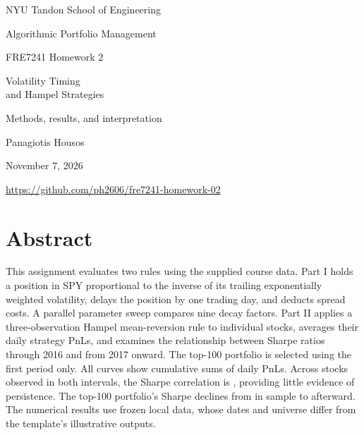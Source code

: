 \documentclass[11pt,letterpaper]{article}
\begin{document}
\hypersetup{pageanchor=false}
\begin{titlepage}
\vspace*{0.6in}
{\color{teal}\large NYU Tandon School of Engineering\par}
\vspace{0.25in}
{\color{navy}\LARGE Algorithmic Portfolio Management\par}
\vspace{0.15in}
{\large FRE7241 \quad Homework 2\par}
\vspace{0.65in}
{\color{navy}\Huge Volatility Timing\\[0.12in]and Hampel Strategies\par}
\vspace{0.3in}
{\Large Methods, results, and interpretation\par}
\vspace{0.65in}
{\Large Panagiotis Housos\par}
\vspace{0.12in}
{\large November 7, 2026\par}
\vspace{0.3in}
{\small\url{https://github.com/ph2606/fre7241-homework-02}\par}
\end{titlepage}
\hypersetup{pageanchor=true}

\section*{Abstract}
This assignment evaluates two rules using the supplied course data. Part I
holds a position in SPY proportional to the inverse of its trailing
exponentially weighted volatility, delays the position by one trading day,
and deducts spread costs. A parallel parameter sweep compares nine decay
factors. Part II applies a three-observation Hampel mean-reversion rule to
individual stocks, averages their daily strategy PnLs, and examines the
relationship between Sharpe ratios through 2016 and from 2017 onward. The
top-100 portfolio is selected using the first period only. All curves show
cumulative sums of daily PnLs. Across \HWMatchedStocks{} stocks observed
in both intervals, the Sharpe correlation is
\HWPersistenceCorrelation{}, providing little evidence of persistence.
The top-100 portfolio's Sharpe declines from \HWTopISSharpe{} in sample to
\HWTopOOSSharpe{} afterward. The numerical results use frozen local data,
whose dates and universe differ from the template's illustrative outputs.
\end{document}

